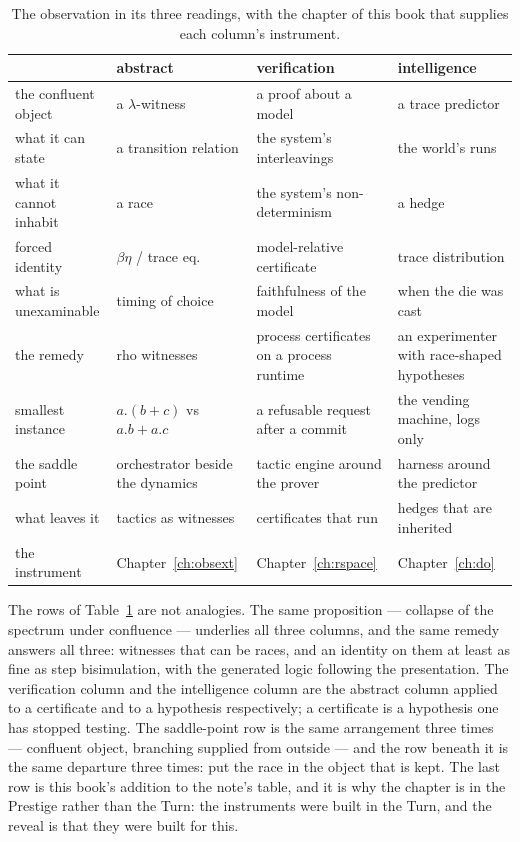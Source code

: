 \begin{table}[t]
\centering
\small
\begin{tabular}{@{}p{}p{}p{}p{}@{}}
\toprule
 & \textbf{abstract} & \textbf{verification} & \textbf{intelligence} \\
\midrule
the confluent object & a $\lambda$-witness & a proof about a model & a trace predictor \\
what it can state & a transition relation & the system's interleavings & the world's runs \\
what it cannot inhabit & a race & the system's non-determinism & a hedge \\
forced identity & $\beta\eta$ / trace eq. & model-relative certificate & trace distribution \\
what is unexaminable & timing of choice & faithfulness of the model & when the die was cast \\
the remedy & rho witnesses & process certificates on a process runtime & an experimenter with race-shaped hypotheses \\
smallest instance & $a.(b+c)$ vs $a.b+a.c$ & a refusable request after a commit & the vending machine, logs only \\
the saddle point & orchestrator beside the dynamics & tactic engine around the prover & harness around the predictor \\
what leaves it & tactics as witnesses & certificates that run & hedges that are inherited \\
the instrument & Chapter~\ref{ch:obsext} & Chapter~\ref{ch:rspace} & Chapter~\ref{ch:do} \\
\bottomrule
\end{tabular}
\caption{The observation in its three readings, with the chapter of this book that supplies each column's instrument.}
\label{inh:tab:three}
\end{table}

The rows of Table~\ref{inh:tab:three} are not analogies.
The same proposition --- collapse of the spectrum under confluence ---
underlies all three columns, and the same remedy answers all three:
witnesses that can be races, and an identity on them at least as fine
as step bisimulation, with the generated logic following the
presentation.
The verification column and the intelligence column are the abstract
column applied to a certificate and to a hypothesis respectively; a
certificate is a hypothesis one has stopped testing.
The saddle-point row is the same arrangement three times --- confluent
object, branching supplied from outside --- and the row beneath it is
the same departure three times: put the race in the object that is
kept.
The last row is this book's addition to the note's table, and it is why
the chapter is in the Prestige rather than the Turn: the instruments
were built in the Turn, and the reveal is that they were built for this.

